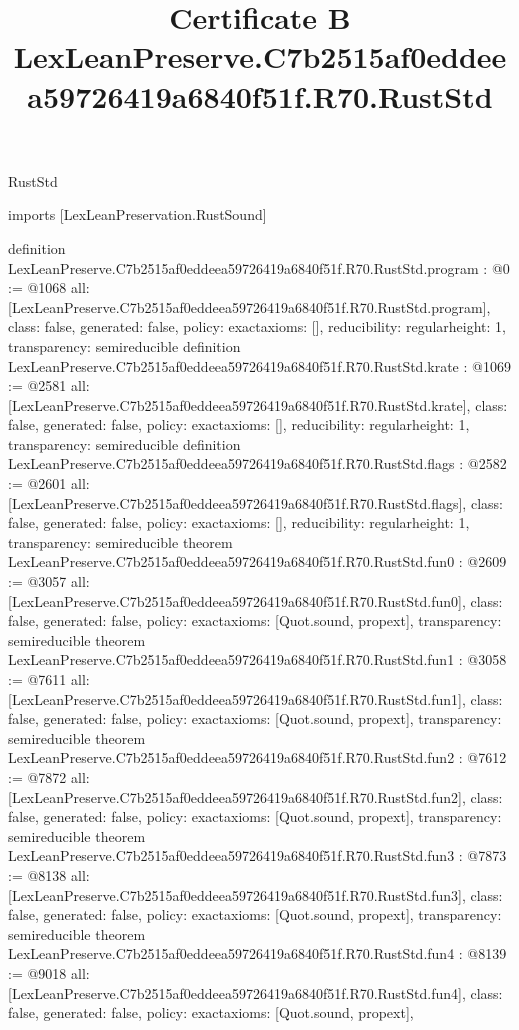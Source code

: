 \begin{lexlean}{RustStd}
\title{Certificate B LexLeanPreserve.C7b2515af0eddeea59726419a6840f51f.R70.RustStd}
\begin{coremodule}
imports [LexLeanPreservation.RustSound]

definition LexLeanPreserve.C7b2515af0eddeea59726419a6840f51f.R70.RustStd.program : @0 := @1068 {
  all: [LexLeanPreserve.C7b2515af0eddeea59726419a6840f51f.R70.RustStd.program],
  class: false,
  generated: false,
  policy: exact{axioms: []},
  reducibility: regular{height: 1},
  transparency: semireducible
}
definition LexLeanPreserve.C7b2515af0eddeea59726419a6840f51f.R70.RustStd.krate : @1069 := @2581 {
  all: [LexLeanPreserve.C7b2515af0eddeea59726419a6840f51f.R70.RustStd.krate],
  class: false,
  generated: false,
  policy: exact{axioms: []},
  reducibility: regular{height: 1},
  transparency: semireducible
}
definition LexLeanPreserve.C7b2515af0eddeea59726419a6840f51f.R70.RustStd.flags : @2582 := @2601 {
  all: [LexLeanPreserve.C7b2515af0eddeea59726419a6840f51f.R70.RustStd.flags],
  class: false,
  generated: false,
  policy: exact{axioms: []},
  reducibility: regular{height: 1},
  transparency: semireducible
}
theorem LexLeanPreserve.C7b2515af0eddeea59726419a6840f51f.R70.RustStd.fun0 : @2609 := @3057 {
  all: [LexLeanPreserve.C7b2515af0eddeea59726419a6840f51f.R70.RustStd.fun0],
  class: false,
  generated: false,
  policy: exact{axioms: [Quot.sound, propext]},
  transparency: semireducible
}
theorem LexLeanPreserve.C7b2515af0eddeea59726419a6840f51f.R70.RustStd.fun1 : @3058 := @7611 {
  all: [LexLeanPreserve.C7b2515af0eddeea59726419a6840f51f.R70.RustStd.fun1],
  class: false,
  generated: false,
  policy: exact{axioms: [Quot.sound, propext]},
  transparency: semireducible
}
theorem LexLeanPreserve.C7b2515af0eddeea59726419a6840f51f.R70.RustStd.fun2 : @7612 := @7872 {
  all: [LexLeanPreserve.C7b2515af0eddeea59726419a6840f51f.R70.RustStd.fun2],
  class: false,
  generated: false,
  policy: exact{axioms: [Quot.sound, propext]},
  transparency: semireducible
}
theorem LexLeanPreserve.C7b2515af0eddeea59726419a6840f51f.R70.RustStd.fun3 : @7873 := @8138 {
  all: [LexLeanPreserve.C7b2515af0eddeea59726419a6840f51f.R70.RustStd.fun3],
  class: false,
  generated: false,
  policy: exact{axioms: [Quot.sound, propext]},
  transparency: semireducible
}
theorem LexLeanPreserve.C7b2515af0eddeea59726419a6840f51f.R70.RustStd.fun4 : @8139 := @9018 {
  all: [LexLeanPreserve.C7b2515af0eddeea59726419a6840f51f.R70.RustStd.fun4],
  class: false,
  generated: false,
  policy: exact{axioms: [Quot.sound, propext]},
}
\end{coremodule}
\end{lexlean}
